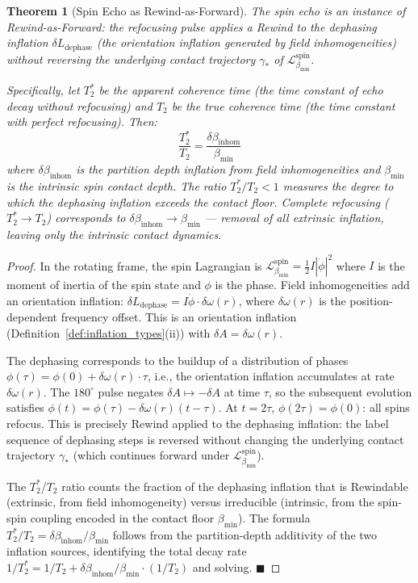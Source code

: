 \documentclass[12pt, a4paper]{article}
\theoremstyle{plain}
\newtheorem{theorem}{Theorem}[section]
\theoremstyle{definition}
\theoremstyle{remark}
\newcommand{\bmin}{\beta_{\min}}
\newcommand{\Lmin}{\mathcal{L}_{\bmin}}
\newcommand{\half}{\tfrac{1}{2}}
\newcommand{\qed}{\hfill$\blacksquare$}
\begin{document}
\begin{theorem}[Spin Echo as Rewind-as-Forward]
\label{thm:spinecho}
The spin echo is an instance of Rewind-as-Forward: the refocusing pulse
applies a Rewind to the \emph{dephasing inflation} $\delta L_{\mathrm{dephase}}$
(the orientation inflation generated by field inhomogeneities) without reversing
the underlying contact trajectory $\gamma_*$ of $\Lmin^{\mathrm{spin}}$.

Specifically, let $T_2^*$ be the apparent coherence time (the time constant of
echo decay without refocusing) and $T_2$ be the true coherence time (the time
constant with perfect refocusing). Then:
\[
  \frac{T_2^*}{T_2} = \frac{\delta\beta_{\mathrm{inhom}}}{\bmin}
\]
where $\delta\beta_{\mathrm{inhom}}$ is the partition depth inflation from
field inhomogeneities and $\bmin$ is the intrinsic spin contact depth.
The ratio $T_2^*/T_2 < 1$ measures the degree to which the dephasing inflation
exceeds the contact floor. Complete refocusing ($T_2^* \to T_2$) corresponds to
$\delta\beta_{\mathrm{inhom}} \to \bmin$ --- removal of all extrinsic inflation,
leaving only the intrinsic contact dynamics.
\end{theorem}

\begin{proof}
In the rotating frame, the spin Lagrangian is $\Lmin^{\mathrm{spin}} = \half I|\dot{\phi}|^2$
where $I$ is the moment of inertia of the spin state and $\phi$ is the phase.
Field inhomogeneities add an orientation inflation: $\delta L_{\mathrm{dephase}}
= I\dot{\phi}\cdot\delta\omega(r)$, where $\delta\omega(r)$ is the
position-dependent frequency offset. This is an orientation inflation
(Definition~\ref{def:inflation_types}(ii)) with $\delta A = \delta\omega(r)$.

The dephasing corresponds to the buildup of a distribution of phases
$\phi(\tau) = \phi(0) + \delta\omega(r)\cdot\tau$, i.e., the orientation
inflation accumulates at rate $\delta\omega(r)$. The $180^\circ$ pulse negates
$\delta A \mapsto -\delta A$ at time $\tau$, so the subsequent evolution
satisfies $\phi(t) = \phi(\tau) - \delta\omega(r)(t - \tau)$. At $t = 2\tau$,
$\phi(2\tau) = \phi(0)$: all spins refocus. This is precisely Rewind applied
to the dephasing inflation: the label sequence of dephasing steps is reversed
without changing the underlying contact trajectory $\gamma_*$ (which continues
forward under $\Lmin^{\mathrm{spin}}$).

The $T_2^*$/$T_2$ ratio counts the fraction of the dephasing inflation that is
Rewindable (extrinsic, from field inhomogeneity) versus irreducible (intrinsic,
from the spin-spin coupling encoded in the contact floor $\bmin$). The formula
$T_2^*/T_2 = \delta\beta_{\mathrm{inhom}}/\bmin$ follows from the
partition-depth additivity of the two inflation sources, identifying the total
decay rate $1/T_2^* = 1/T_2 + \delta\beta_{\mathrm{inhom}}/\bmin\cdot(1/T_2)$
and solving. \qed
\end{proof}
\end{document}
